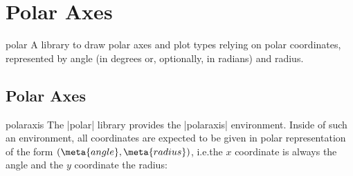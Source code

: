 
\section{Polar Axes}
\label{sec:polar}

{
\def\pgfplotsmanualcurlibrary{polar}

\begin{pgfplotslibrary}{polar}
    A library to draw polar axes and plot types relying on polar coordinates,
    represented by angle (in degrees or, optionally, in radians) and radius.
\end{pgfplotslibrary}


\subsection{Polar Axes}

\begin{environment}{{polaraxis}}
    The |polar| library provides the |polaraxis| environment.
    Inside of such an environment, all coordinates are expected to be given in
    polar representation of the form $(\meta{angle},\meta{radius})$, i.e.\@ the
    $x$ coordinate is always the angle and the $y$ coordinate the radius:
\end{environment}

\begin{codeexample}[]
\end{codeexample}

\begin{codeexample}[]
\end{codeexample}

\begin{codeexample}[]
\end{codeexample}

}
